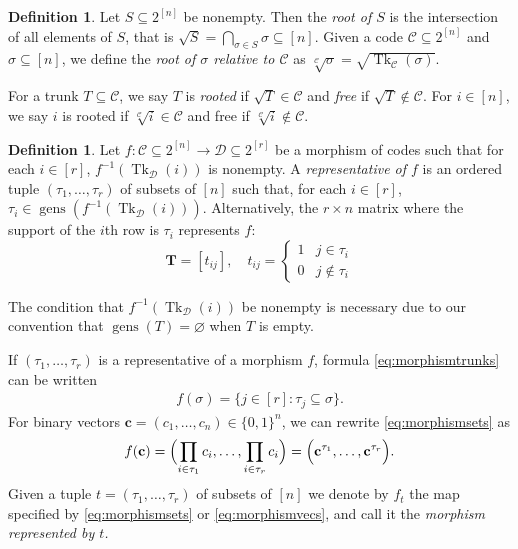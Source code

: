 \documentclass[11pt,letterpaper, reqno]{amsart}
\theoremstyle{definition}
\newtheorem{defn}[thm]{Definition}   %
\DeclareMathOperator{\tk}{Tk}
\DeclareMathOperator{\gens}{gens}
\def\bc{\mathbf{c}}
\def\bT{\mathbf{T}}
\def\cC{\mathcal{C}}
\def\cD{\mathcal{D}}
\begin{document}
    \begin{defn}\label{def:root}
        Let $S \subseteq 2^{[n]}$ be nonempty. 
        Then the \emph{root of $S$} is the intersection of all elements of $S$, that is $\sqrt{S} = \bigcap_{\sigma \in S} \sigma \subseteq [n]$.
        Given a code $\cC\subseteq 2^{[n]}$ and $\sigma \subseteq [n]$, we define the \emph{root of $\sigma$ relative to $\cC$} as $\sqrt[\cC]{\sigma} = \sqrt{\tk_\cC(\sigma)}$.
        
        For a trunk $T \subseteq \cC$, we say $T$ is \emph{rooted} if $\sqrt{T} \in \cC$ and \emph{free} if $\sqrt{T} \notin \cC$. For $i \in [n]$, we say $i$ is rooted if $\sqrt[\cC]{i} \in \cC$ and free if $\sqrt[\cC]{i} \notin \cC$.
    \end{defn}
        
    \begin{defn}
    Let $f: \cC \subseteq 2^{[n]} \to \cD \subseteq 2^{[r]}$ be a morphism of codes such that for each $i \in [r]$, $f^{-1}(\tk_\cD(i))$ is nonempty.
    A \emph{representative of $f$} is an ordered tuple $(\tau_1,\dots,\tau_r)$ of subsets of $[n]$ such that, for each $i \in [r]$, $\tau_i \in \gens(f^{-1}(\tk_\cD(i)))$.
    Alternatively, the $r\times n$ matrix where the support of the $i$th row is $\tau_i$ represents $f$:
        \begin{equation}\label{eq: T}
             \bT = [t_{ij}], \quad t_{ij} = \begin{cases}
            1 & j \in \tau_i\\
            0 & j \notin \tau_i
        \end{cases} 
        \end{equation}
    \end{defn}
    The condition that $f^{-1}(\tk_\cD(i))$ be nonempty is necessary due to our convention that $\gens(T) = \varnothing$ when $T$ is empty.
    
    If $(\tau_1,\dots,\tau_r)$ is a representative of a morphism $f$, formula \eqref{eq:morphismtrunks} can be written
        \begin{align}
            f(\sigma) = \{j \in [r] : \tau_j \subseteq \sigma\}. \label{eq:morphismsets} 
        \end{align}
    For binary vectors $\bc = (c_1,\dots,c_n) \in \{0,1\}^n$, we can rewrite \eqref{eq:morphismsets} as
        \begin{align}
            f(\bc) = \Bigl(\prod_{i \in \tau_1} c_i, \dots, \prod_{i \in \tau_r} c_i \Bigr)=\Bigl( \bc^{\tau_1}, \dots, \bc^{\tau_r} \Bigr). \label{eq:morphismvecs}
        \end{align}
    Given a tuple $t = (\tau_1,\dots,\tau_r)$ of subsets of $[n]$ we denote by $f_t$ the map specified by \eqref{eq:morphismsets} or \eqref{eq:morphismvecs}, and call it the \emph{morphism represented by $t$.}
    
\end{document}

